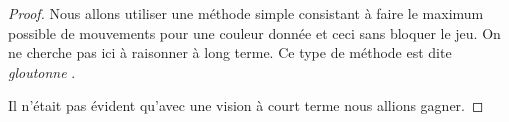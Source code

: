 \begin{proof}
	Nous allons utiliser une méthode simple consistant à faire le maximum possible de mouvements pour une couleur donnée et ceci sans bloquer le jeu. On ne cherche pas ici à raisonner à long terme. Ce type de méthode est dite \emph{\itshape \og gloutonne \fg}.

\begin{mvts}
	\medskip
	\item  {}

	\medskip
	\item  {}

	\medskip
	\item  {}

	\medskip
	\item  {}

	\medskip
	\item  {}

	\medskip
	\item  {}

	\medskip
	\item  {}

	\medskip
	\item  {}

	\medskip
	\item  {}
\end{mvts}

Il n'était pas évident qu'avec une vision à court terme nous allions gagner.
\end{proof}